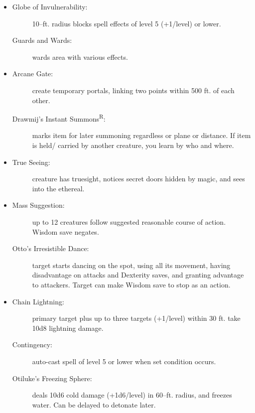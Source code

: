 \documentclass[DIV=14, paper=a4, fontsize=12pt, twocolumn, twoside]{scrartcl}
\begin{document}
\begin{itemize}[align=parleft,labelwidth=1cm]
	\renewcommand{\labelitemi}{Abjur}\item
	\begin{description}
 \item[Globe of Invulnerability:] 10–ft. radius blocks spell effects of level 5 (+1/level) or lower.
 \item[Guards and Wards:] wards area with various effects.
\end{description}
\renewcommand{\labelitemi}{Conj}\item
\begin{description}
 \item[Arcane Gate:] create temporary portals, linking two points within 500 ft. of each other.
 \item[Drawmij’s Instant Summons\textsuperscript{R}:] marks item for later summoning regardless or plane or distance. If item is held/ carried by another creature, you learn by who and where.
\end{description}
\renewcommand{\labelitemi}{Div}\item
\begin{description}
 \item[True Seeing:] creature has truesight, notices secret doors hidden by magic, and sees into the ethereal.
\end{description}
\renewcommand{\labelitemi}{Ench}\item
\begin{description}
 \item[Mass Suggestion:] up to 12 creatures follow suggested reasonable course of action. Wisdom save negates.
 \item[Otto’s Irresistible Dance:] target starts dancing on the spot, using all its movement, having disadvantage on attacks and Dexterity saves, and granting advantage to attackers. Target can make Wisdom save to stop as an action.
\end{description}
\renewcommand{\labelitemi}{Evoc}\item
\begin{description}
 \item[Chain Lightning:] primary target plus up to three targets (+1/level) within 30 ft. take 10d8 lightning damage.
 \item[Contingency:] auto-cast spell of level 5 or lower when set condition occurs.
 \item[Otiluke’s Freezing Sphere:] deals 10d6 cold damage (+1d6/level) in 60–ft. radius, and freezes water. Can be delayed to detonate later.

\end{description}
\end{itemize}
\end{document}
